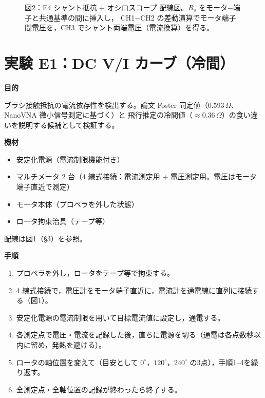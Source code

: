 \documentclass[a4paper,11pt]{ltjsarticle}
\newcommand{\expfield}[1]{\medskip\noindent\textbf{#1}\par\nobreak\smallskip\noindent}
\begin{document}
\begin{figure}[H]
\caption{図2：E4 シャント抵抗 + オシロスコープ 配線図。$R_s$ をモータ$-$端子と共通基準の間に挿入し，
CH1$-$CH2 の差動演算でモータ端子間電圧を，CH3 でシャント両端電圧（電流換算）を得る。}
\label{fig:e4_wiring}
\end{figure}

\section{実験 E1：DC V/I カーブ（冷間）}
\expfield{目的}
ブラシ接触抵抗の電流依存性を検出する。論文 Foster 同定値（$0.593\,\Omega$、NanoVNA 微小信号測定に基づく）と
飛行推定の冷間値（$\approx 0.36\,\Omega$）の食い違いを説明する候補として検証する。

\expfield{機材}
\begin{itemize}
  \item 安定化電源（電流制限機能付き）
  \item マルチメータ 2 台（4 線式接続：電流測定用 + 電圧測定用。電圧はモータ端子直近で測定）
  \item モータ本体（プロペラを外した状態）
  \item ロータ拘束治具（テープ等）
\end{itemize}
配線は図1（\S3）を参照。

\expfield{手順}
\begin{enumerate}
  \item プロペラを外し，ロータをテープ等で拘束する。
  \item 4 線式接続で，電圧計をモータ端子直近に，電流計を通電線に直列に接続する（図1）。
  \item 安定化電源の電流制限を用いて目標電流値に設定し，通電する。
  \item 各測定点で電圧・電流を記録した後，直ちに電源を切る（通電は各点数秒以内に留め，発熱を避ける）。
  \item ロータの軸位置を変えて（目安として $0^\circ$，$120^\circ$，$240^\circ$ の3点），手順1--4を繰り返す。
  \item 全測定点・全軸位置の記録が終わったら終了する。
\end{enumerate}
\end{document}
